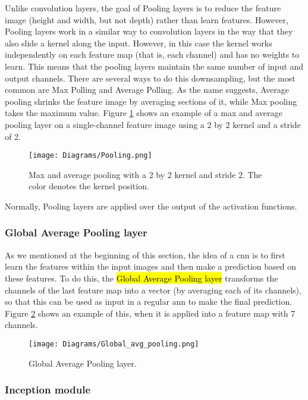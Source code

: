 Unlike convolution layers, the goal of Pooling layers is to reduce the feature image (height and width, but not depth) rather than learn features.
However, Pooling layers work in a similar way to convolution layers in the way that they also slide a kernel along the input. However, in this case the kernel works independently on each feature map (that is, each channel) and has no weights to learn.
This means that the pooling layers maintain the same number of input and output channels.
There are several ways to do this downsampling, but the most common are Max Polling and Average Polling. As the name suggests, Average pooling shrinks the feature image by averaging sections of it, while Max pooling takes the maximum value. Figure \ref{fig:basics:pooling} shows an example of a max and average pooling layer on a single-channel feature image using a 2 by 2 kernel and a stride of 2.

\begin{figure}[!ht]
  \centering
  \texttt{[image: Diagrams/Pooling.png]}
  \caption{Max and average pooling with a 2 by 2 kernel and stride 2. The color denotes the kernel position.}
  \label{fig:basics:pooling}
\end{figure}

Normally, Pooling layers are applied over the output of the activation functions.

\subsubsection{Global Average Pooling layer}

As we mentioned at the beginning of this section, the idea of a \gls{cnn} is to first learn the features within the input images and then make a prediction based on these features. To do this, the \hl{Global Average Pooling layer} transforms the channels of the last feature map into a vector (by averaging each of its channels), so that this can be used as input in a regular \gls{ann} to make the final prediction. Figure \ref{fig:basics:global_avg_pool} shows an example of this, when it is applied into a feature map with 7 channels.

\begin{figure}[!ht]
  \centering
  \texttt{[image: Diagrams/Global\_avg\_pooling.png]}
  \caption{Global Average Pooling layer.}
  \label{fig:basics:global_avg_pool}
\end{figure}

\subsubsection{Inception module}

